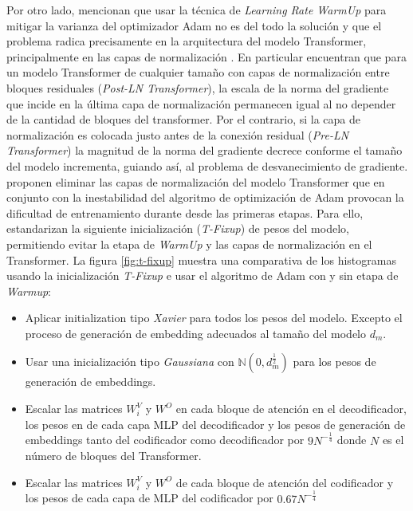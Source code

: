 Por otro lado, \citeauthor{pmlr-v119-huang20f} mencionan que usar la técnica de \textit{Learning Rate WarmUp}
para mitigar la varianza del optimizador Adam no es del todo la solución y que el problema radica
precisamente en la arquitectura del modelo Transformer, principalmente en las capas de normalización
\cite{DBLP:journals/corr/abs-1804-09849} \cite{DBLP:journals/corr/abs-2002-04745}. En particular
\citeauthor{DBLP:journals/corr/abs-2002-04745} encuentran que para un modelo Transformer de cualquier
tamaño con capas de normalización entre bloques residuales (\textit{Post-LN Transformer}), la escala
de la norma del gradiente que incide en la última capa de normalización permanecen igual al no depender
de la cantidad de bloques del transformer. Por el contrario, si la capa de normalización es colocada
justo antes de la conexión residual (\textit{Pre-LN Transformer}) la magnitud de la norma del
gradiente decrece conforme el tamaño del modelo incrementa, guiando así, al problema de desvanecimiento de
gradiente. \citeauthor{pmlr-v119-huang20f} proponen eliminar las capas de normalización del modelo
Transformer que en conjunto con la inestabilidad del algoritmo de optimización de Adam provocan la
dificultad de entrenamiento durante desde las primeras etapas. Para ello, estandarizan la siguiente
inicialización (\textit{T-Fixup}) de pesos del modelo, permitiendo evitar la etapa de \textit{WarmUp}
y las capas de normalización en el Transformer. La figura \ref{fig:t-fixup} muestra una comparativa
de los histogramas usando la inicialización \textit{T-Fixup} e usar el algoritmo de Adam con y sin
etapa de \textit{Warmup}:

\begin{itemize}
    \item Aplicar initialization tipo \textit{Xavier} para todos los pesos del modelo.
          Excepto el proceso de generación de embedding adecuados al tamaño del modelo $d_m$.
    \item Usar una inicialización tipo \textit{Gaussiana} con $\mathbb{N}(0, d_m^\frac{1}{2})$ para
          los pesos de generación de embeddings.
    \item Escalar las matrices $W_i^V$ y $W^O$ en cada bloque de atención en el decodificador, los
          pesos en de cada capa MLP del decodificador y los pesos de generación de embeddings tanto
          del codificador como decodificador por $9N^{-\frac{1}{4}}$ donde $N$ es el número de bloques
          del Transformer.
    \item Escalar las matrices $W_i^V$ y $W^O$ de cada bloque de atención del codificador y los pesos
          de cada capa de MLP del codificador por $0.67N^{-\frac{1}{4}}$
\end{itemize}

